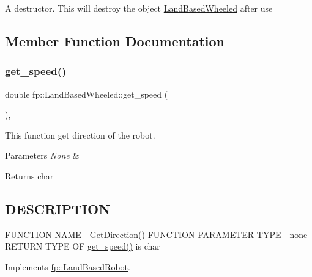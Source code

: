 A destructor. This will destroy the object \hyperlink{classfp_1_1_land_based_wheeled}{Land\+Based\+Wheeled} after use 

\subsection{Member Function Documentation}
\mbox{\label{classfp_1_1_land_based_wheeled_ab687789dad29fe8178ed1e60bd79500f}} 
\subsubsection{\texorpdfstring{get\+\_\+speed()}{get\_speed()}}
{\footnotesize\ttfamily double fp\+::\+Land\+Based\+Wheeled\+::get\+\_\+speed (\begin{DoxyParamCaption}{ }\end{DoxyParamCaption})\hspace{0.3cm}{\ttfamily [inline]}, {\ttfamily [virtual]}}



This function get direction of the robot. 


\begin{DoxyParams}{Parameters}
{\em None} & \\
\hline
\end{DoxyParams}
\begin{DoxyReturn}{Returns}
char 
\end{DoxyReturn}
\hypertarget{_m_a_z_e_8h_DESCRIPTION}{}\subsection{D\+E\+S\+C\+R\+I\+P\+T\+I\+ON}\label{_m_a_z_e_8h_DESCRIPTION}
F\+U\+N\+C\+T\+I\+ON N\+A\+ME -\/ \hyperlink{classfp_1_1_land_based_wheeled_a87c986392b37f25dd63e03866c2ab9c2}{Get\+Direction()} F\+U\+N\+C\+T\+I\+ON P\+A\+R\+A\+M\+E\+T\+ER T\+Y\+PE -\/ none R\+E\+T\+U\+RN T\+Y\+PE OF \hyperlink{classfp_1_1_land_based_wheeled_ab687789dad29fe8178ed1e60bd79500f}{get\+\_\+speed()} is char 

Implements \hyperlink{classfp_1_1_land_based_robot_a68844e9c442d1b293945144dc6c6608c}{fp\+::\+Land\+Based\+Robot}.

\mbox{\label{classfp_1_1_land_based_wheeled_a75cb4df0270397db3a019f1abc694cf9}} 
